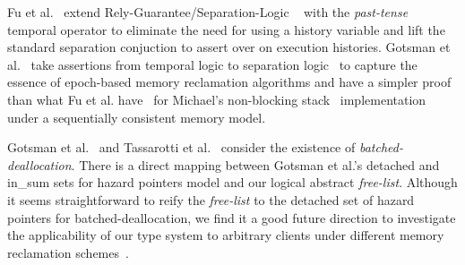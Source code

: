  Fu et al.~\cite{shao_temp} extend Rely-Guarantee/Separation-Logic ~\cite{vafeiadis07,Feng:2007:RCS:1762174.1762193,Feng:2009:LRR:1480881.1480922} with the \textit{past-tense} temporal operator to eliminate the need for using a history variable and lift the standard separation conjuction to assert over on execution histories. Gotsman et al.~\cite{Gotsman:2013:VCM:2450268.2450289} take assertions from temporal logic to separation logic~\cite{vafeiadis07} to capture the essence of epoch-based memory reclamation algorithms and have a simpler proof than what Fu et al. have~\cite{shao_temp} for Michael's non-blocking stack~\cite{Michael:2004:HPS:987524.987595} implementation under a sequentially consistent memory model.

 Gotsman et al.~\cite{Gotsman:2013:VCM:2450268.2450289} and Tassarotti et al.~\cite{verrcu} consider the existence of \textit{batched-deallocation}. There is a direct mapping between Gotsman et al.'s \textsf{detached} and \textsf{in\_sum} sets for hazard pointers model and our logical abstract \textit{free-list}. Although it seems straightforward to reify the \textit{free-list} to the \textsf{detached} set of hazard pointers for batched-deallocation, we find it a good future direction to investigate the applicability of our type system to arbitrary clients under different memory reclamation schemes~\cite{Wen:2018:IMR:3178487.3178488,Michael:2004:HPS:987524.987595,Mckenney:2004:EDD:1048173,UCAM-CL-TR-579}.
%

